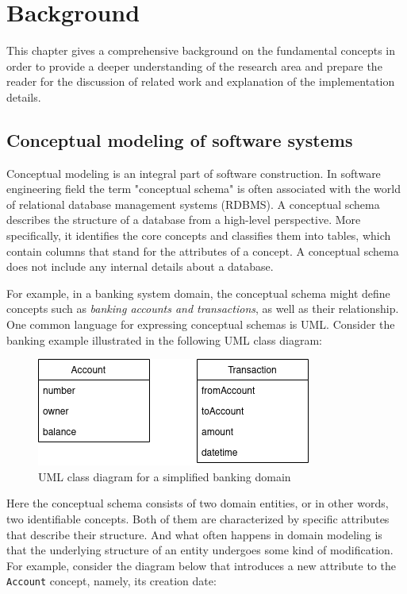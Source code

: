 \chapter{Background}
This chapter gives a comprehensive background on the fundamental concepts in order to provide a deeper understanding of the research area and prepare the reader for the discussion of related work and explanation of the implementation details.

\section{Conceptual modeling of software systems}
Conceptual modeling is an integral part of software construction. In software engineering field the term "conceptual schema" is often associated with the world of relational database management systems (RDBMS). A conceptual schema describes the structure of a database from a high-level perspective. More specifically, it identifies the core concepts and classifies them into tables, which contain columns that stand for the attributes of a concept. A conceptual schema does not include any internal details about a database.

\n

For example, in a banking system domain, the conceptual schema might define concepts such as \textit{banking accounts and transactions}, as well as their relationship. One common language for expressing conceptual schemas is UML. Consider the banking example illustrated in the following UML class diagram:

\begin{figure}[H]\centering
    \includegraphics[scale=0.65]{images/banking.drawio.png}
    \caption{UML class diagram for a simplified banking domain}\label{fig:bank}
\end{figure}

Here the conceptual schema consists of two domain entities, or in other words, two identifiable concepts. Both of them are characterized by specific attributes that describe their structure. And what often happens in domain modeling is that the underlying structure of an entity undergoes some kind of modification. For example, consider the diagram below that introduces a new attribute to the \texttt{Account} concept, namely, its creation date:

